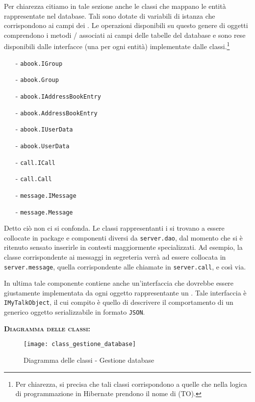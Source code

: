 \begin{description}
Per chiarezza citiamo in tale sezione anche le classi che mappano le entità rappresentate nel database. Tali sono dotate di variabili di istanza che corrispondono ai campi dei . Le operazioni disponibili su questo genere di oggetti comprendono i metodi / associati ai campi delle tabelle del database e sono rese disponibili dalle interfacce (una per ogni entità) implementate dalle classi.\footnote{%
	Per chiarezza, si precisa che tali classi corrispondono a quelle che nella logica di programmazione in Hibernate prendono il nome di  (TO)\@.
	}
	\begin{itemize}
	  \item[-] \texttt{abook.IGroup}
	  \item[-] \texttt{abook.Group}
	  \item[-] \texttt{abook.IAddressBookEntry}
	  \item[-] \texttt{abook.AddressBookEntry}
	  \item[-] \texttt{abook.IUserData}
	  \item[-] \texttt{abook.UserData}
	  \item[-] \texttt{call.ICall}
	  \item[-] \texttt{call.Call}
	  \item[-] \texttt{message.IMessage}
	  \item[-] \texttt{message.Message}
	\end{itemize}

Detto ciò non ci si confonda. Le classi rappresentanti i  si trovano a essere collocate in package e componenti diversi da \texttt{server.dao}, dal momento che si è ritenuto sensato inserirle in contesti maggiormente specializzati. Ad esempio, la classe corrispondente ai messaggi in segreteria verrà ad essere collocata in \texttt{server.message}, quella corrispondente alle chiamate in \texttt{server.call}, e così via.

In ultima tale componente contiene anche un'interfaccia che dovrebbe essere giustamente implementata da ogni oggetto rappresentante un . Tale interfaccia è \texttt{IMyTalkObject}, il cui compito è quello di descrivere il comportamento di un generico oggetto serializzabile in formato \texttt{JSON}.

\item{\scshape\bfseries Diagramma delle classi:}
\begin{figure}[H]
  \centering
  \texttt{[image: class\_gestione\_database]}
  \caption{Diagramma delle classi - Gestione database}\label{fig:gestionedatabase}
\end{figure}


\end{description}
